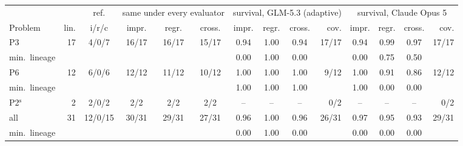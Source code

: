 \setlength{\tabcolsep}{2.6pt}\begin{tabular}{@{}lrcccccccrcccr@{}}
  \toprule
  & & ref. & \multicolumn{3}{c}{same under every evaluator} & \multicolumn{4}{c}{survival, GLM-5.3 (adaptive)} & \multicolumn{4}{c}{survival, Claude Opus 5} \\
  \cmidrule(lr){4-6}\cmidrule(lr){7-10}\cmidrule(lr){11-14}
  Problem & lin. & i/r/c & impr. & regr. & cross. & impr. & regr. & cross. & cov. & impr. & regr. & cross. & cov. \\
  \midrule
  P3 & 17 & 4/0/7 & 16/17 & 16/17 & 15/17 & 0.94 & 1.00 & 0.94 & 17/17 & 0.94 & 0.99 & 0.97 & 17/17 \\
  \quad min.\ lineage & & & & & & 0.00 & 1.00 & 0.00 &  & 0.00 & 0.75 & 0.50 &  \\
  P6 & 12 & 6/0/6 & 12/12 & 11/12 & 10/12 & 1.00 & 1.00 & 1.00 & 9/12 & 1.00 & 0.91 & 0.86 & 12/12 \\
  \quad min.\ lineage & & & & & & 1.00 & 1.00 & 1.00 &  & 1.00 & 0.00 & 0.00 &  \\
  P2$^{\mathrm{s}}$ & 2 & 2/0/2 & 2/2 & 2/2 & 2/2 & -- & -- & -- & 0/2 & -- & -- & -- & 0/2 \\
  \midrule
  all & 31 & 12/0/15 & 30/31 & 29/31 & 27/31 & 0.96 & 1.00 & 0.96 & 26/31 & 0.97 & 0.95 & 0.93 & 29/31 \\
  \quad min.\ lineage & & & & & & 0.00 & 1.00 & 0.00 &  & 0.00 & 0.00 & 0.00 &  \\
  \bottomrule
\end{tabular}
\par\vspace{1pt}{\raggedright\scriptsize ref.\ = defect-corrected layer, an author-maintained and partly model-derived reference (the written GLM$\cap$Kimi layer with 3 correction entries); i/r/c = lineages it reads as improved / regressed / crossed, so every regression conclusion is False and ``never regressed'' matches it perfectly; survival = exact probability that the per-text replay reproduces the reference conclusion (agreement with the reference, not accuracy); min.\ = lowest covered lineage.\par}
